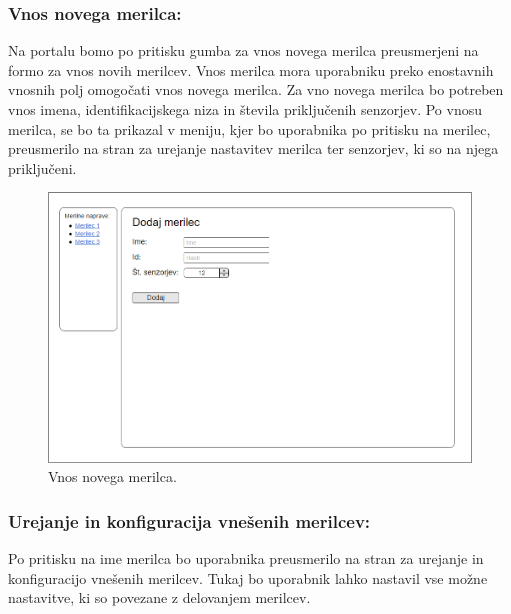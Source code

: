 \documentclass[12pt,a4paper,titlepage,openany]{report}
\begin{document}
\subsubsection{Vnos novega merilca:}
Na portalu bomo po pritisku gumba za vnos novega merilca preusmerjeni na formo za vnos novih merilcev. Vnos merilca mora uporabniku preko enostavnih vnosnih polj omogočati vnos novega merilca. Za vno novega merilca bo potreben vnos imena, identifikacijskega niza in števila priključenih senzorjev. Po vnosu merilca, se bo ta prikazal v meniju, kjer bo uporabnika po pritisku na merilec, preusmerilo na stran za urejanje nastavitev merilca ter senzorjev, ki so na njega priključeni.

\begin{figure}[H]
\begin{center}
\includegraphics[width=1\linewidth]{Slike/VnosNovegaMerilca.png}
\end{center}
\caption{Vnos novega merilca.}\label{slika:VnosNovegaMerilca}
\end{figure}

\subsubsection{Urejanje in konfiguracija vnešenih merilcev:}
Po pritisku na ime merilca bo uporabnika preusmerilo na stran za urejanje in konfiguracijo vnešenih merilcev. Tukaj bo uporabnik lahko nastavil vse možne nastavitve, ki so povezane z delovanjem merilcev.
\end{document}
